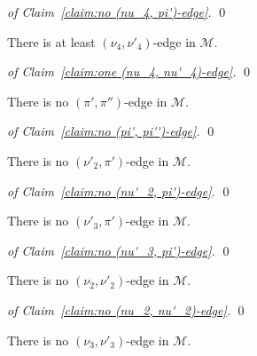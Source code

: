 \documentclass[a4paper,10pt]{llncs}
\begin{document}
\begin{proof}[of Claim~\ref{claim:no (nu_4, pi')-edge}]
  \qed
\end{proof}

\begin{claim}
  \label{claim:one (nu_4, nu'_4)-edge}
  There is at least $(\nu_4, \nu'_4)$-edge in $\mathcal{M}$.
\end{claim}

\begin{proof}[of Claim~\ref{claim:one (nu_4, nu'_4)-edge}]
  \qed
\end{proof}

\begin{claim}
  \label{claim:no (pi', pi'')-edge}
  There is no $(\pi', \pi'')$-edge in $\mathcal{M}$.
\end{claim}

\begin{proof}[of Claim~\ref{claim:no (pi', pi'')-edge}]
  \qed
\end{proof}

\begin{claim}
  \label{claim:no (nu'_2, pi')-edge}
  There is no $(\nu'_2, \pi')$-edge in $\mathcal{M}$.
\end{claim}

\begin{proof}[of Claim~\ref{claim:no (nu'_2, pi')-edge}]
  \qed
\end{proof}

\begin{claim}
  \label{claim:no (nu'_3, pi')-edge}
  There is no $(\nu'_3, \pi')$-edge in $\mathcal{M}$.
\end{claim}

\begin{proof}[of Claim~\ref{claim:no (nu'_3, pi')-edge}]
  \qed
\end{proof}

\begin{claim}
  \label{claim:no (nu_2, nu'_2)-edge}
  There is no $(\nu_2, \nu'_2)$-edge in $\mathcal{M}$.
\end{claim}

\begin{proof}[of Claim~\ref{claim:no (nu_2, nu'_2)-edge}]
  \qed
\end{proof}

\begin{claim}
  \label{claim:no (nu_3, nu'_3)-edge}
  There is no $(\nu_3, \nu'_3)$-edge in $\mathcal{M}$.
\end{claim}
\end{document}
